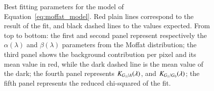 \begin{figure}[h]
     \centering
     \caption{Best fitting parameters for the model of Equation~\ref{eq:moffat_model}. Red plain lines correspond to the result of the fit, and black dashed lines to the values expected. From top to bottom: the first and second panel represent respectively the $\alpha(\lambda)$ and $\beta(\lambda)$ parameters from the Moffat distribution; the third panel shows the background contribution per pixel and its mean value in red, while the dark dashed line is the mean value of the dark; the fourth panel represents $K_{G_1/A}(\lambda)$, and $K_{G_1/G_0}(\lambda)$; the fifth panel represents the reduced chi-squared of the fit.}
     \label{fig:result_params}
\end{figure}

%
%
%
%

